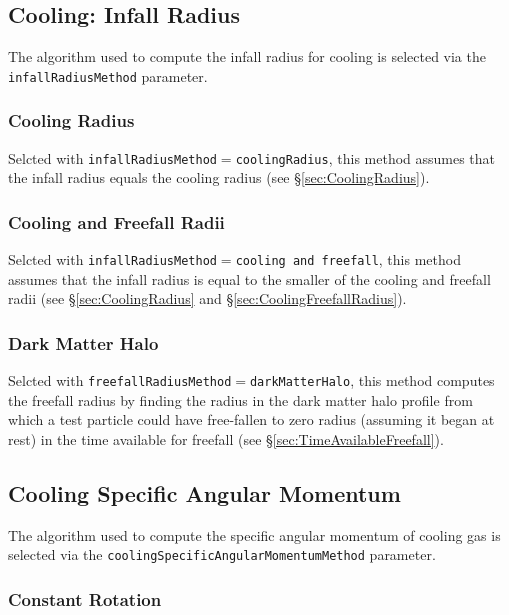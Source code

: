 \subsection{Cooling: Infall Radius}\label{sec:CoolingInfallRadius}

The algorithm used to compute the infall radius for cooling is selected via the {\tt infallRadiusMethod} parameter.

\subsubsection{Cooling Radius}

Selcted with {\tt infallRadiusMethod}$=${\tt coolingRadius}, this method assumes that the infall radius equals the cooling radius (see \S\ref{sec:CoolingRadius}).

\subsubsection{Cooling and Freefall Radii}

Selcted with {\tt infallRadiusMethod}$=${\tt cooling and freefall}, this method assumes that the infall radius is equal to the smaller of the cooling and freefall radii (see \S\ref{sec:CoolingRadius} and \S\ref{sec:CoolingFreefallRadius}).

\subsubsection{Dark Matter Halo}

Selcted with {\tt freefallRadiusMethod}$=${\tt darkMatterHalo}, this method computes the freefall radius by finding the radius in the dark matter halo profile from which a test particle could have free-fallen to zero radius (assuming it began at rest) in the time available for freefall (see \S\ref{sec:TimeAvailableFreefall}).

\subsection{Cooling Specific Angular Momentum}

The algorithm used to compute the specific angular momentum of cooling gas is selected via the {\tt coolingSpecificAngularMomentumMethod} parameter.

\subsubsection{Constant Rotation}

